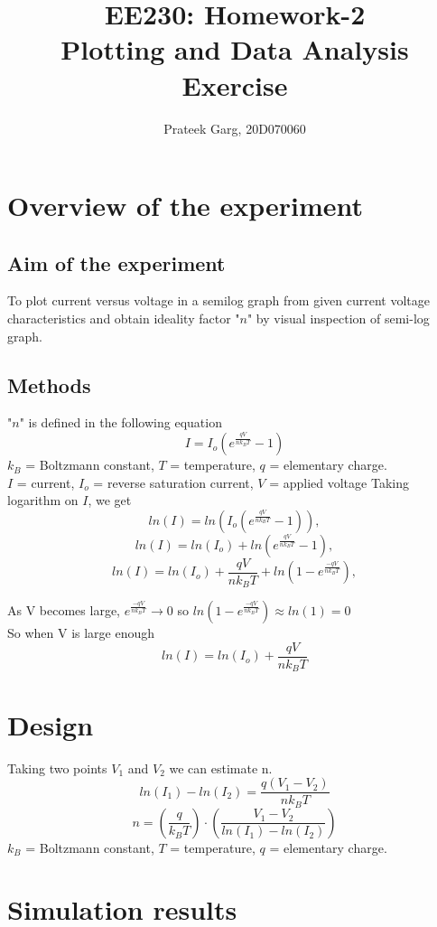 \documentclass[12pt]{article}
\title{ \textbf{EE230: Homework-2\\
Plotting and Data Analysis Exercise}}
\author{Prateek Garg, 20D070060}
\begin{document}
\noindent
\maketitle


\section{Overview of the experiment}

\subsection{Aim of the experiment}
To plot current versus voltage in a semilog graph from given current voltage characteristics and obtain ideality factor "$n$" by visual inspection of semi-log graph.
\subsection{Methods}
"$n$" is defined in the following equation $$I = I_{o}(e^{\frac{qV}{nk_{B}T}}-1)$$
$k_{B}$ = Boltzmann constant, $T$ = temperature, $q$ = elementary
charge. \\
$I$ = current, $I_{o}$ = reverse saturation current, $V$ = applied voltage
Taking logarithm on $I$, we get 
$$ln(I) = ln(I_{o}(e^{\frac{qV}{nk_{B}T}}-1)),$$ 
$$ln(I) = ln(I_{o})+ln(e^{\frac{qV}{nk_{B}T}}-1),$$
$$ln(I) = ln(I_{o})+\frac{qV}{nk_{B}T}+ln(1-e^{\frac{-qV}{nk_{B}T}}),$$

As V becomes large, $e^{\frac{-qV}{nk_{B}T}} \rightarrow 0$ so $ln(1-e^{\frac{-qV}{nk_{B}T}}) \approx ln(1)=0$ \\
So when V is large enough
$$ln(I) = ln(I_{o})+\frac{qV}{nk_{B}T}$$

\section{Design}
Taking two points $V_{1}$ and $V_{2}$ we can estimate n. 
$$ln(I_{1})-ln(I_{2}) = \frac{q(V_{1}-V_{2})}{nk_{B}T}$$
$$n=\left(\frac{q}{k_{B}T}\right)\cdot \left(\frac{V_{1}-V_{2}}{ln(I_{1})-ln(I_{2})}\right)$$
$k_{B}$ = Boltzmann constant, $T$ = temperature, $q$ = elementary
charge. \\

\section{Simulation results}
\end{document}

